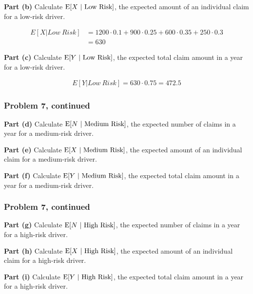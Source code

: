 \documentclass[12pt]{article}
\theoremstyle{definition}
\begin{document}
\vspace{0.5in}
\noindent
{\bf Part (b)} Calculate $\hbox{E}[X\ |\ \hbox{Low Risk}]$, the expected amount of an individual claim for a low-risk driver.

\begin{align*}
E[X|Low\ Risk] &= 1200 \cdot 0.1 + 900 \cdot 0.25 + 600 \cdot 0.35 + 250 \cdot 0.3\\
&= 630
\end{align*}

\vspace{1.5in}
\noindent
{\bf Part (c)} Calculate $\hbox{E}[Y\ |\ \hbox{Low Risk}]$, the expected total claim amount in a year for a low-risk driver.

\begin{align*}
E[Y|Low\ Risk] = 630 \cdot 0.75 = 472.5
\end{align*}

\newpage
\subsubsection*{Problem 7, continued}

\bigskip
\noindent
{\bf Part (d)} Calculate $\hbox{E}[N\ |\ \hbox{Medium Risk}]$, the expected number of claims in a year for a medium-risk driver.

\vspace{1in}
\noindent
{\bf Part (e)} Calculate $\hbox{E}[X\ |\ \hbox{Medium Risk}]$, the expected amount of an individual claim for a medium-risk driver.

\vspace{3.5in}
\noindent
{\bf Part (f)} Calculate $\hbox{E}[Y\ |\ \hbox{Medium Risk}]$, the expected total claim amount in a year for a medium-risk driver.


\newpage
\subsubsection*{Problem 7, continued}

\bigskip
\noindent
{\bf Part (g)} Calculate $\hbox{E}[N\ |\ \hbox{High Risk}]$, the expected number of claims in a year for a high-risk driver.

\vspace{1in}
\noindent
{\bf Part (h)} Calculate $\hbox{E}[X\ |\ \hbox{High Risk}]$, the expected amount of an individual claim for a high-risk driver.

\vspace{3.5in}
\noindent
{\bf Part (i)} Calculate $\hbox{E}[Y\ |\ \hbox{High Risk}]$, the expected total claim amount in a year for a high-risk driver.
\end{document}
